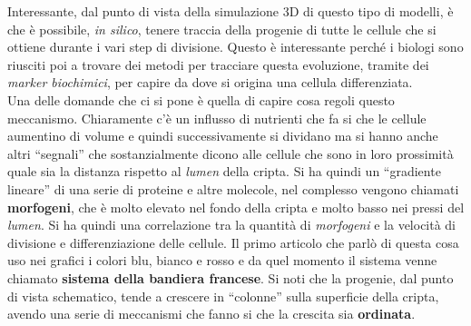 \documentclass[a4paper,12pt, oneside]{book}
\begin{document}
Interessante, dal punto di vista della simulazione 3D di questo tipo di modelli,
è che è possibile, \textit{in silico}, tenere traccia della progenie di tutte le
cellule che si ottiene durante i vari step di divisione. Questo è interessante
perché i biologi sono riusciti poi a trovare dei metodi per tracciare questa
evoluzione, tramite dei \textit{marker biochimici}, per capire da dove si
origina una cellula differenziata. \\
Una delle domande che ci si pone è quella di capire cosa regoli questo
meccanismo. Chiaramente c'è un influsso di nutrienti che fa si che le cellule
aumentino di volume e quindi successivamente si dividano ma si hanno anche altri
``segnali'' che sostanzialmente dicono alle cellule che sono in loro prossimità
quale sia la distanza rispetto al \textit{lumen} della cripta. Si ha quindi un
``gradiente lineare'' di una serie di proteine e altre molecole, nel complesso
vengono chiamati \textbf{morfogeni}, che è molto
elevato nel fondo della cripta e molto basso nei pressi del \textit{lumen}. Si
ha quindi una correlazione tra la quantità di \textit{morfogeni} e la velocità
di divisione e differenziazione delle cellule. Il primo articolo che parlò di
questa cosa uso nei grafici i colori blu, bianco e rosso e da quel momento il
sistema venne chiamato \textbf{sistema della bandiera francese}.
Si noti che la progenie, dal punto di vista schematico, tende a crescere in
``colonne'' sulla superficie della cripta, avendo una serie di meccanismi che
fanno si che la crescita sia \textbf{ordinata}.
\end{document}
